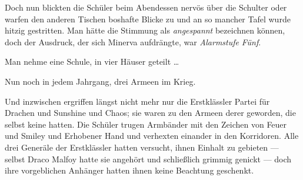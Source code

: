 Doch nun blickten die Schüler beim Abendessen nervös über die Schulter oder warfen den anderen Tischen boshafte Blicke zu und an so mancher Tafel wurde hitzig gestritten. Man hätte die Stimmung als \emph{angespannt} bezeichnen können, doch der Ausdruck, der sich Minerva aufdrängte, war \emph{Alarmstufe} \emph{Fünf}.

Man nehme eine Schule, in vier Häuser geteilt …

Nun noch in jedem Jahrgang, drei Armeen im Krieg.

Und inzwischen ergriffen längst nicht mehr nur die Erstklässler Partei für Drachen und Sunshine und Chaos; sie waren zu den Armeen derer geworden, die selbst keine hatten. Die Schüler trugen Armbänder mit den Zeichen von Feuer und Smiley und Erhobener Hand und verhexten einander in den Korridoren. Alle drei Generäle der Erstklässler hatten versucht, ihnen Einhalt zu gebieten — selbst Draco Malfoy hatte sie angehört und schließlich grimmig genickt — doch ihre vorgeblichen Anhänger hatten ihnen keine Beachtung geschenkt.

